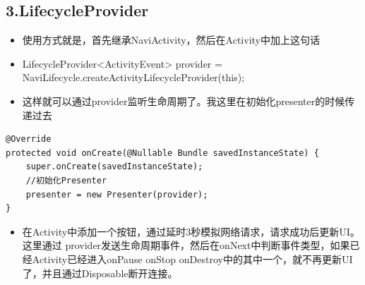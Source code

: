 \documentclass[9pt, b5paper]{article}
\begin{document}
\subsection{3.LifecycleProvider}
\label{sec-20-4}
\begin{itemize}
\item 使用方式就是，首先继承NaviActivity，然后在Activity中加上这句话
\item LifecycleProvider<ActivityEvent> provider = NaviLifecycle.createActivityLifecycleProvider(this);
\item 这样就可以通过provider监听生命周期了。我这里在初始化presenter的时候传递过去
\end{itemize}
\begin{verbatim}
@Override
protected void onCreate(@Nullable Bundle savedInstanceState) {
    super.onCreate(savedInstanceState);
    //初始化Presenter
    presenter = new Presenter(provider);
}
\end{verbatim}
\begin{itemize}
\item 在Activity中添加一个按钮，通过延时3秒模拟网络请求，请求成功后更新UI。这里通过 provider发送生命周期事件，然后在onNext中判断事件类型，如果已经Activity已经进入onPause onStop onDestroy中的其中一个，就不再更新UI了，并且通过Disposable断开连接。
\end{itemize}
\end{document}
